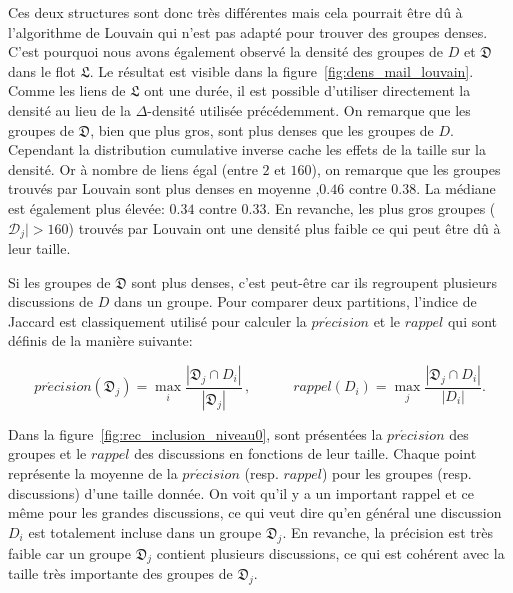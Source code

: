 Ces deux structures sont donc très différentes mais cela pourrait être dû à l'algorithme de Louvain qui n'est pas adapté pour trouver des groupes denses.
C'est pourquoi nous avons également observé la densité des groupes de $D$ et $\mathfrak{D}$ dans le flot $\mathfrak{L}$.
Le résultat est visible dans la figure~\ref{fig:dens_mail_louvain}.
Comme les liens de $\mathfrak{L}$ ont une durée, il est possible d'utiliser directement la densité au lieu de la $\Delta$-densité utilisée précédemment.
On remarque que les groupes de $\mathfrak{D}$, bien que plus gros, sont plus denses que les groupes de $D$.
Cependant la distribution cumulative inverse cache les effets de la taille sur la densité.
Or à nombre de liens égal (entre $2$ et $160$), on remarque que les groupes trouvés par Louvain sont  plus denses en moyenne ,$0.46$ contre $0.38$. 
La médiane est également plus élevée: $0.34$ contre $0.33$.
En revanche, les plus gros groupes ($\mathcal{D}_j|>160$) trouvés par Louvain ont une densité plus faible ce qui peut être dû à leur taille.

Si les groupes de $\mathfrak{D}$ sont plus denses, c'est peut-être car ils regroupent plusieurs discussions de $D$ dans un groupe.
Pour comparer deux partitions, l'indice de Jaccard est classiquement utilisé pour calculer la $pr\acute{e}cision$ et le $rappel$ qui sont définis de la manière suivante:

\begin{equation*}
pr\acute{e}cision(\mathfrak{D}_j)= \max_{i} \frac{|\mathfrak{D}_j \cap D_i|}{|\mathfrak{D}_j|}\,, \quad \qquad
rappel(D_i)= \max_{j} \frac{|\mathfrak{D}_j \cap D_i|}{|D_i|}.
\label{eq:rappel}
\end{equation*}

Dans la figure~\ref{fig:rec_inclusion_niveau0}, sont présentées la $pr\acute{e}cision$  des groupes et le $rappel$ des discussions en fonctions de leur taille.
Chaque point représente la moyenne de la $pr\acute{e}cision$ (resp. $rappel$) pour les groupes (resp. discussions) d'une taille donnée.
On voit qu'il y a un important rappel et ce même pour les grandes discussions, ce qui veut dire qu'en général une discussion $D_i$ est totalement incluse dans un groupe $\mathfrak{D}_j$.
En revanche, la précision est très faible car un groupe $\mathfrak{D}_j$ contient plusieurs discussions, ce qui est cohérent avec la taille très importante des groupes de $\mathfrak{D}_j$.

